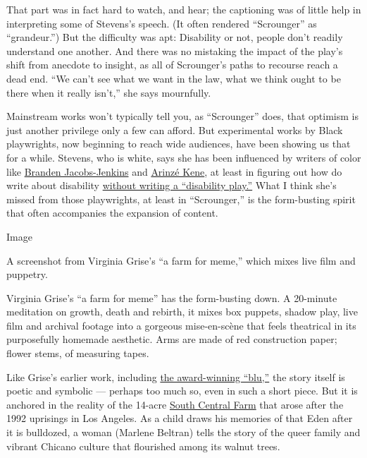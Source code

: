 That part was in fact hard to watch, and hear; the captioning was of
little help in interpreting some of Stevens's speech. (It often rendered
``Scrounger'' as ``grandeur.'') But the difficulty was apt: Disability
or not, people don't readily understand one another. And there was no
mistaking the impact of the play's shift from anecdote to insight, as
all of Scrounger's paths to recourse reach a dead end. ``We can't see
what we want in the law, what we think ought to be there when it really
isn't,'' she says mournfully.

Mainstream works won't typically tell you, as ``Scrounger'' does, that
optimism is just another privilege only a few can afford. But
experimental works by Black playwrights, now beginning to reach wide
audiences, have been showing us that for a while. Stevens, who is white,
says she has been influenced by writers of color like
\href{https://www.nytimes3xbfgragh.onion/2014/11/23/magazine/branden-jacobs-jenkins-isnt-writing-about-race.html}{Branden
Jacobs-Jenkins} and
\href{https://www.theguardian.com/stage/2019/apr/27/arinze-kene-interview-misty-death-of-a-salesman}{Arinzé
Kene}, at least in figuring out how do write about disability
\href{https://www.larktheatre.org/blog/athena-stevens-box-ticking-narrative-control/}{without
writing a ``disability play.''} What I think she's missed from those
playwrights, at least in ``Scrounger,'' is the form-busting spirit that
often accompanies the expansion of content.

Image

A screenshot from Virginia Grise's ``a farm for meme,'' which mixes live
film and puppetry.

Virginia Grise's ``a farm for meme'' has the form-busting down. A
20-minute meditation on growth, death and rebirth, it mixes box puppets,
shadow play, live film and archival footage into a gorgeous
mise-en-scène that feels theatrical in its purposefully homemade
aesthetic. Arms are made of red construction paper; flower stems, of
measuring tapes.

Like Grise's earlier work, including
\href{https://artsbeat.blogs.nytimes3xbfgragh.onion/2010/02/23/yale-drama-series-prize-awarded/}{the
award-winning ``blu,''} the story itself is poetic and symbolic ---
perhaps too much so, even in such a short piece. But it is anchored in
the reality of the 14-acre
\href{https://www.southcentralfarm.org/about-us}{South Central Farm}
that arose after the 1992 uprisings in Los Angeles. As a child draws his
memories of that Eden after it is bulldozed, a woman (Marlene Beltran)
tells the story of the queer family and vibrant Chicano culture that
flourished among its walnut trees.

